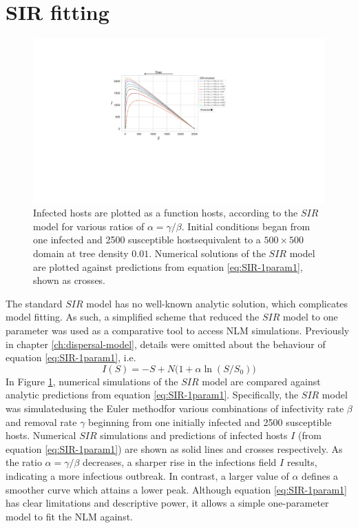 \section{SIR fitting}
\label{A:sir-fitting}
\begin{figure}
    \centering
    \includegraphics[scale=0.54]{chapter5/figures/fig2-sir-fitting-A.pdf}
    \caption{Infected hosts are plotted as a function hosts, according to the $SIR$ model for various ratios of $\alpha=\gamma / \beta$.
            Initial conditions began from one infected and 2500 susceptible hosts\textemdash equivalent to a $500\times500$ domain at tree density $0.01$.
            Numerical solutions of the $SIR$ model are plotted against predictions from equation \ref{eq:SIR-1param1}, shown as crosses.}
    \label{fig:sir-fitting-a}
\end{figure}

The standard $SIR$ model has no well-known analytic solution, which complicates model fitting.
As such, a simplified scheme that reduced the $SIR$ model to one parameter was used as a comparative tool to access NLM simulations.
Previously in chapter \ref{ch:dispersal-model}, details were omitted about the behaviour of equation \ref{eq:SIR-1param1}, i.e.
\[
I(S) = -S +  N \Big( 1 + \alpha \ln(S / S_0) \Big)
\]
In Figure \ref{fig:sir-fitting-a}, numerical simulations of the $SIR$ model are compared against analytic predictions from equation \ref{eq:SIR-1param1}.
Specifically, the $SIR$ model was simulated\textemdash using the Euler method\textemdash for various combinations of infectivity rate $\beta$ and removal rate $\gamma$ beginning from
one initially infected and 2500 susceptible hosts.
Numerical $SIR$ simulations and predictions of infected hosts $I$ (from equation \ref{eq:SIR-1param1}) are shown as solid lines and crosses respectively.
As the ratio $\alpha=\gamma/\beta$ decreases, a sharper rise in the infections field $I$ results, indicating a more infectious outbreak.
In contrast, a larger value of $\alpha$ defines a smoother curve which attains a lower peak.
Although equation \ref{eq:SIR-1param1} has clear limitations and descriptive power, it allows a simple one-parameter model to fit the NLM against.

